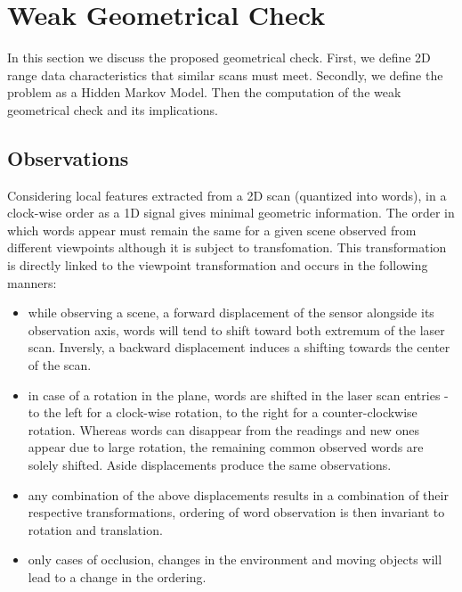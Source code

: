 \section{Weak Geometrical Check}
\label{sec:chap3}

In this section we discuss the proposed geometrical check. First, we define 2D range data characteristics that similar scans must meet. Secondly, we define the problem as a Hidden Markov Model. Then the computation of the weak geometrical check and its implications.

\subsection{Observations}
\label{sec:obs}

Considering local features extracted from a 2D scan (quantized into words), in a clock-wise order as a 1D signal gives minimal geometric information. The order in which words appear must remain the same for a given scene observed from different viewpoints although it is subject to transfomation. This transformation is directly linked to the viewpoint transformation and occurs in the following manners:
\begin{itemize}
\item while observing a scene, a forward displacement of the sensor alongside its observation axis, words will tend to shift toward both extremum of the laser scan. Inversly, a backward displacement induces a shifting towards the center of the scan.
\item in case of a rotation in the plane, words are shifted in the laser scan entries - to the left for a clock-wise rotation, to the right for a counter-clockwise rotation. Whereas words can disappear from the readings and new ones appear due to large rotation, the remaining common observed words are solely shifted. Aside displacements produce the same observations.
\item any combination of the above displacements results in a combination of their respective transformations, ordering of word observation is then invariant to rotation and translation.
\item only cases of occlusion, changes in the environment and moving objects will lead to a change in the ordering.
\end{itemize}


